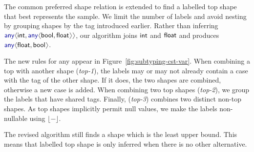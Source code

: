 \documentclass[10pt,preprint,clearpagebib]{sigplanconf}
\newcommand{\langl}{\begin{picture}(4.5,7)
\put(1.1,2.5){\rotatebox{60}{\line(1,0){5.5}}}
\put(1.1,2.5){\rotatebox{300}{\line(1,0){5.5}}}
\end{picture}}
\newcommand{\rangl}{\begin{picture}(4.5,7)
\put(.9,2.5){\rotatebox{120}{\line(1,0){5.5}}}
\put(.9,2.5){\rotatebox{240}{\line(1,0){5.5}}}
\end{picture}}
\newcommand{\kvd}[1]{\textnormal{\textcolor{kvdclr}{\sffamily #1}}}
\newcommand{\ident}[1]{\textnormal{\sffamily #1}}
\newcommand{\dropopt}[1]{\lfloor#1\rfloor}
\begin{document}
The common preferred shape relation is extended to find a labelled top shape that best represents 
the sample. We limit the number of labels and avoid nesting by grouping shapes by the tag 
introduced earlier.
Rather than inferring $\kvd{any}\langl\ident{int}, \kvd{any}\langl\ident{bool}, \ident{float}\rangl\rangl$, 
our algorithm joins $\ident{int}$ and $\ident{float}$ and produces 
$\kvd{any}\langl\ident{float},\ident{bool}\rangl$. 

The new rules for \kvd{any} appear in Figure~\ref{fig:subtyping-cst-var}. When 
combining a top with another shape (\emph{top-1}), the labels may or may not already 
contain a case with the tag of the other shape. If it does, the two shapes are combined, otherwise 
a new case is added. When combining two top shapes (\emph{top-2}), we group the labels that have 
shared tags. Finally, (\emph{top-3}) combines two distinct non-top 
shapes. As top shapes implicitly permit \kvd{null} values, we make the labels non-nullable 
using $\dropopt{-}$.

The revised algorithm still finds a shape which is the least upper bound. This means that 
labelled top shape is only inferred when there is no other alternative.

\end{document}
